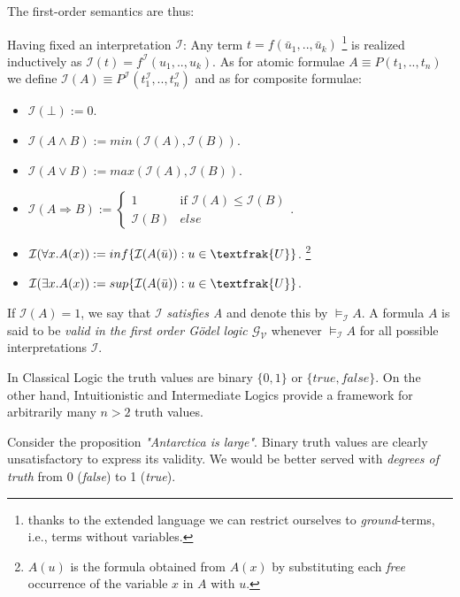 		 The first-order semantics are thus:
		 \newpage
		 \begin{definition}\label{fosemantics}
		 	Having fixed an interpretation $\mathcal{I}$: \newline
		 	Any term $t = f(\bar{u}_1,..,\bar{u}_k)$ \footnote{thanks to the extended language we can restrict ourselves to \emph{ground}-terms, i.e., terms without variables.} is realized inductively as $\mathcal{I}(t) = f^{\mathcal{I}} (u_1,..,u_k)$. \newline
		 	As for atomic formulae $A \equiv P(t_1,..,t_n)$ we define $\mathcal{I}(A) \equiv P^{\mathcal{I}} (t_1^{\mathcal{I}},..,t_n^\mathcal{I})$ and as for composite formulae:
		 	\begin{itemize}
		 		\item $\mathcal{I}(\bot) := 0$. 
		 		\item $\mathcal{I}(A \land B) := min(\mathcal{I}(A),\mathcal{I}(B))$.
		 		\item $\mathcal{I}(A \lor B) := max(\mathcal{I}(A),\mathcal{I}(B))$.
		 		\item $\mathcal{I}(A \Rightarrow B) :=\begin{cases}
		 			1 & \text{if }\mathcal{I}(A) \leq \mathcal{I}(B)\\
		 			\mathcal{I}(B) &	else 
		 		\end{cases}     $.
		 		\item $\mathcal{I}(\forall x.A(x)) := inf \{\mathcal{I}(A(\bar{u})) : u \in \textfrak{U}\}$.
		 		\footnote{$A(u)$ is the formula obtained from $A(x)$ by substituting each \emph{free} occurrence of the variable $x$ in $A$ with $u$. }
		 		\item $\mathcal{I}(\exists x.A(x)) := sup \{\mathcal{I}(A(\bar{u})) : u \in \textfrak{U}\}$.
		 	\end{itemize} 
		 	If $\mathcal{I}(A)=1$, we say that $\mathcal{I}$ \emph{satisfies A} and denote this by $\models_{\mathcal{I}} A$. \newline
		 A formula $A$ is said to be \emph{valid in the first order Gödel logic $\mathcal{G}_\mathcal{V}$} whenever $\models_{\mathcal{I}} A$ for all possible interpretations $\mathcal{I}$.
		 \end{definition} 
 	 In Classical Logic the truth values are binary $\{0,1\}$ or $\{true,false\}$. \newline On the other hand, Intuitionistic and Intermediate Logics provide a framework for arbitrarily many $n>2$ truth values.
		 
		 \begin{remark}
		 	Consider the proposition \emph{"Antarctica is large"}. Binary truth values are clearly unsatisfactory to express its validity. We would be better served with \emph{degrees of truth} from 0 (\emph{false}) to 1 (\emph{true}).
		 \end{remark}
		 
